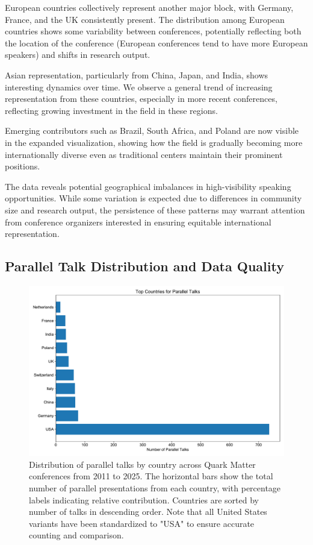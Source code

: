 \documentclass[a4paper,11pt]{article}
\begin{document}
European countries collectively represent another major block, with Germany, France, and the UK consistently present. The distribution among European countries shows some variability between conferences, potentially reflecting both the location of the conference (European conferences tend to have more European speakers) and shifts in research output.

Asian representation, particularly from China, Japan, and India, shows interesting dynamics over time. We observe a general trend of increasing representation from these countries, especially in more recent conferences, reflecting growing investment in the field in these regions.

Emerging contributors such as Brazil, South Africa, and Poland are now visible in the expanded visualization, showing how the field is gradually becoming more internationally diverse even as traditional centers maintain their prominent positions.

The data reveals potential geographical imbalances in high-visibility speaking opportunities. While some variation is expected due to differences in community size and research output, the persistence of these patterns may warrant attention from conference organizers interested in ensuring equitable international representation.

\subsection{Parallel Talk Distribution and Data Quality}

\begin{figure}[H]
\centering
\includegraphics[width=\textwidth]{figures/parallel_talks_by_country.pdf}
\caption{Distribution of parallel talks by country across Quark Matter conferences from 2011 to 2025. The horizontal bars show the total number of parallel presentations from each country, with percentage labels indicating relative contribution. Countries are sorted by number of talks in descending order. Note that all United States variants have been standardized to "USA" to ensure accurate counting and comparison.}
\label{fig:parallel_talks}
\end{figure}
\end{document}
